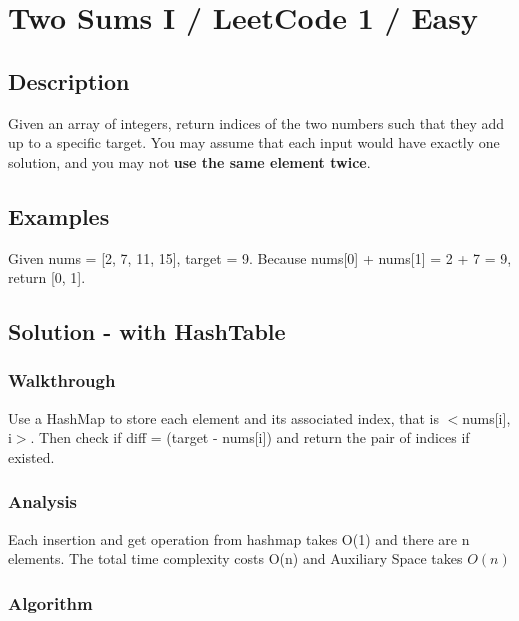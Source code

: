 \documentclass[]{book}
\begin{document}
\hypertarget{two-sums-i-leetcode-1-easy}{%
\section{Two Sums I / LeetCode 1 / Easy}\label{two-sums-i-leetcode-1-easy}}

\hypertarget{description-1}{%
\subsection{Description}\label{description-1}}

Given an array of integers, return indices of the two numbers such that they add up to a specific target.
You may assume that each input would have exactly one solution, and you may not \textbf{use the same element twice}.

\hypertarget{examples}{%
\subsection{Examples}\label{examples}}

Given nums = {[}2, 7, 11, 15{]}, target = 9. Because nums{[}0{]} + nums{[}1{]} = 2 + 7 = 9, return {[}0, 1{]}.

\hypertarget{solution---with-hashtable}{%
\subsection{Solution - with HashTable}\label{solution---with-hashtable}}

\hypertarget{walkthrough-1}{%
\subsubsection{Walkthrough}\label{walkthrough-1}}

Use a HashMap to store each element and its associated index, that is \(<\)nums{[}i{]}, i\(>\). Then check if diff =
(target - nums{[}i{]}) and return the pair of indices if existed.

\hypertarget{analysis-1}{%
\subsubsection{Analysis}\label{analysis-1}}

Each insertion and get operation from hashmap takes O(1) and there are n elements. The total time complexity costs
O(n) and Auxiliary Space takes \(O(n)\)

\hypertarget{algorithm-1}{%
\subsubsection{Algorithm}\label{algorithm-1}}
\end{document}
